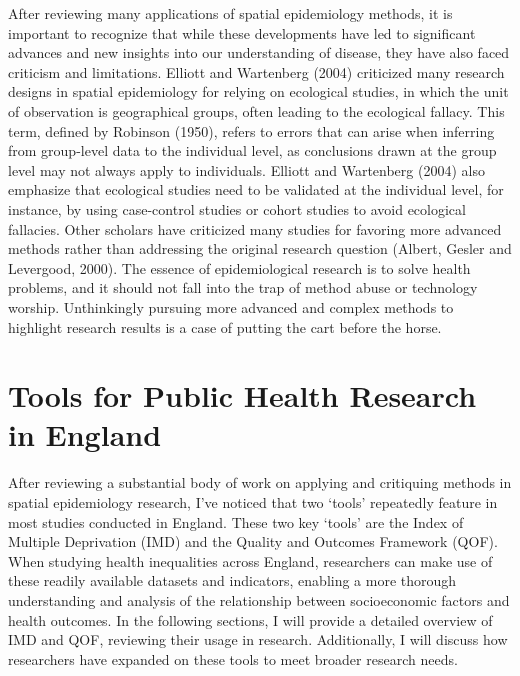 After reviewing many applications of spatial epidemiology methods, it is important to recognize that while these developments have led to significant advances and new insights into our understanding of disease, they have also faced criticism and limitations. Elliott and Wartenberg (2004) criticized many research designs in spatial epidemiology for relying on ecological studies, in which the unit of observation is geographical groups, often leading to the ecological fallacy. This term, defined by Robinson (1950), refers to errors that can arise when inferring from group-level data to the individual level, as conclusions drawn at the group level may not always apply to individuals. Elliott and Wartenberg (2004) also emphasize that ecological studies need to be validated at the individual level, for instance, by using case-control studies or cohort studies to avoid ecological fallacies. Other scholars have criticized many studies for favoring more advanced methods rather than addressing the original research question (Albert, Gesler and Levergood, 2000). The essence of epidemiological research is to solve health problems, and it should not fall into the trap of method abuse or technology worship. Unthinkingly pursuing more advanced and complex methods to highlight research results is a case of putting the cart before the horse.


\section{Tools for Public Health Research in England}
\label{sec:2.4}
After reviewing a substantial body of work on applying and critiquing methods in spatial epidemiology research, I’ve noticed that two `tools’ repeatedly feature in most studies conducted in England. These two key `tools’ are the Index of Multiple Deprivation (IMD) and the Quality and Outcomes Framework (QOF). When studying health inequalities across England, researchers can make use of these readily available datasets and indicators, enabling a more thorough understanding and analysis of the relationship between socioeconomic factors and health outcomes. In the following sections, I will provide a detailed overview of IMD and QOF, reviewing their usage in research. Additionally, I will discuss how researchers have expanded on these tools to meet broader research needs.

